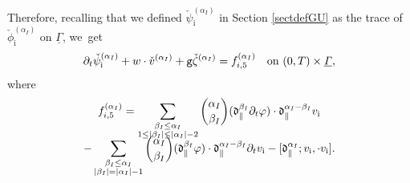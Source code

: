 \documentclass[11pt]{article}
\newcommand{\dpar}{{\mathfrak d}_{\parallel}}
\newcommand{\gr}{{\mathtt g}}
\newcommand{\dt}{\partial_t}
\newcommand{\ul}[1]{\underline{#1}}
\newcommand{\itGamma}{\mathit{\Gamma}}
\theoremstyle{definition}
\begin{document}
Therefore, recalling that we defined $\check\psi_\mathrm{i}^{(\alpha_I)}$ in Section \ref{sectdefGU} as the trace of
$\check{\phi}_\mathrm{i}^{(\alpha_I)}$ on $\ul{\itGamma}$, we~get
\begin{equation}\label{QLBC00}
\dt\check{\psi}_\mathrm{i}^{(\alpha_I)} + w\cdot\check{v}^{(\alpha_I)} + \gr\check{\zeta}^{(\alpha_I)} =f_{{\rm i},5}^{(\alpha_I)}
\quad\text{on } (0,T)\times\ul{\itGamma},
\end{equation}
where
\begin{multline*}
f_{{\rm i},5}^{(\alpha_I)}
= \sum_{\substack{\beta_I\leq\alpha_I\\ 1\leq|\beta_I|\leq|\alpha_I|-2}} \binom{\alpha_I}{\beta_I} (\dpar^{\beta_I}\dt\varphi)\cdot\dpar^{\alpha_I-\beta_I}v_\mathrm{i} \\[-8pt]
- \sum_{\substack{\beta_I\leq\alpha_I\\ |\beta_I|=|\alpha_I|-1}} \binom{\alpha_I}{\beta_I}(\dpar^{\beta_I}\varphi)\cdot\dpar^{\alpha_I-\beta_I}\dt v_\mathrm{i}
- [\dpar^{\alpha_I};v_\mathrm{i},\cdot v_\mathrm{i}].
\end{multline*}
\end{document}
